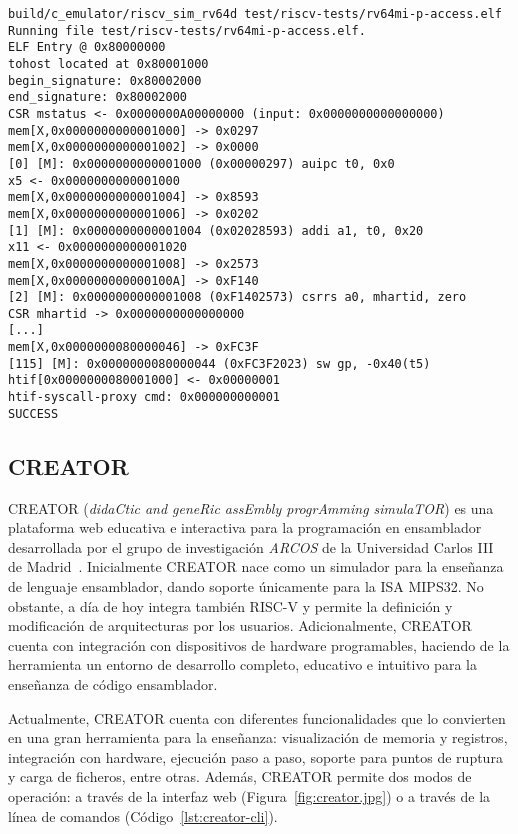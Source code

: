 \begin{lstlisting}[caption=Ejecución del simulador sail-riscv, label={lstl:sail}]
build/c_emulator/riscv_sim_rv64d test/riscv-tests/rv64mi-p-access.elf
Running file test/riscv-tests/rv64mi-p-access.elf.
ELF Entry @ 0x80000000
tohost located at 0x80001000
begin_signature: 0x80002000
end_signature: 0x80002000
CSR mstatus <- 0x0000000A00000000 (input: 0x0000000000000000)
mem[X,0x0000000000001000] -> 0x0297
mem[X,0x0000000000001002] -> 0x0000
[0] [M]: 0x0000000000001000 (0x00000297) auipc t0, 0x0
x5 <- 0x0000000000001000
mem[X,0x0000000000001004] -> 0x8593
mem[X,0x0000000000001006] -> 0x0202
[1] [M]: 0x0000000000001004 (0x02028593) addi a1, t0, 0x20
x11 <- 0x0000000000001020
mem[X,0x0000000000001008] -> 0x2573
mem[X,0x000000000000100A] -> 0xF140
[2] [M]: 0x0000000000001008 (0xF1402573) csrrs a0, mhartid, zero
CSR mhartid -> 0x0000000000000000
[...]
mem[X,0x0000000080000046] -> 0xFC3F
[115] [M]: 0x0000000080000044 (0xFC3F2023) sw gp, -0x40(t5)
htif[0x0000000080001000] <- 0x00000001
htif-syscall-proxy cmd: 0x000000000001
SUCCESS
\end{lstlisting}

\subsection{CREATOR}\label{subsec:creator}

CREATOR (\textit{didaCtic and geneRic assEmbly progrAmming simulaTOR}) es una
plataforma web educativa e interactiva para la programación en
ensamblador desarrollada por el grupo de investigación \textit{ARCOS} de la
Universidad Carlos III de Madrid~\cite{camarmas2024creator}. Inicialmente
CREATOR nace como un
simulador para la enseñanza de lenguaje ensamblador, dando soporte únicamente
para la ISA MIPS32. No obstante, a día de hoy integra también RISC-V y permite
la definición y modificación de arquitecturas por los usuarios. Adicionalmente,
CREATOR cuenta con integración con dispositivos de hardware programables, haciendo de
la herramienta un entorno de desarrollo completo, educativo e intuitivo para la enseñanza
de código ensamblador.

Actualmente, CREATOR cuenta con diferentes funcionalidades que lo convierten en
una gran herramienta para la enseñanza: visualización de memoria y registros,
integración con hardware, ejecución paso a paso, soporte para puntos de ruptura
y carga de ficheros, entre otras. Además, CREATOR permite dos modos de
operación: a través de la interfaz web (Figura~\ref{fig:creator.jpg}) o a
través de la línea de comandos (Código~\ref{lst:creator-cli}).

